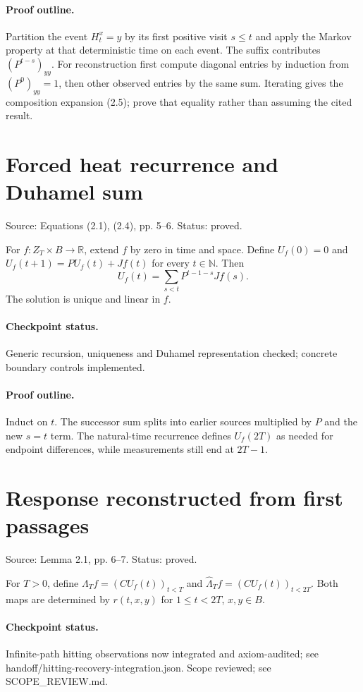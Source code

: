 \paragraph{Proof outline.}

Partition the event $H_t^x=y$ by its first positive visit $s\leq t$ and apply the Markov property at that deterministic time on each event. The suffix contributes $(P^{t-s})_{yy}$. For reconstruction first compute diagonal entries by induction from $(P^0)_{yy}=1$, then other observed entries by the same sum. Iterating gives the composition expansion (2.5); prove that equality rather than assuming the cited result.
\nodebreak
\section{Forced heat recurrence and Duhamel sum}
Source: Equations (2.1), (2.4), pp. 5–6. Status: proved.
\begin{lemma}\label{forced-heat}

For $f:Z_T\times B\to\mathbb R$, extend $f$ by zero in time and space. Define $U_f(0)=0$ and $U_f(t+1)=PU_f(t)+Jf(t)$ for every $t\in\mathbb N$. Then \[U_f(t)=\sum_{s<t}P^{t-1-s}Jf(s).\] The solution is unique and linear in $f$.


\paragraph{Checkpoint status.}
Generic recursion, uniqueness and Duhamel representation checked; concrete boundary controls implemented.
\end{lemma}
\paragraph{Proof outline.}

Induct on $t$. The successor sum splits into earlier sources multiplied by $P$ and the new $s=t$ term. The natural-time recurrence defines $U_f(2T)$ as needed for endpoint differences, while measurements still end at $2T-1$.
\nodebreak
\section{Response reconstructed from first passages}
Source: Lemma 2.1, pp. 6–7. Status: proved.
\begin{lemma}\label{response-data}

For $T>0$, define $\Lambda_T f=(CU_f(t))_{t<T}$ and $\widehat\Lambda_T f=(CU_f(t))_{t<2T}$. Both maps are determined by $r(t,x,y)$ for $1\leq t<2T$, $x,y\in B$.


\paragraph{Checkpoint status.}
Infinite-path hitting observations now integrated and axiom-audited; see handoff/hitting-recovery-integration.json. Scope reviewed; see SCOPE\_REVIEW.md.
\end{lemma}
